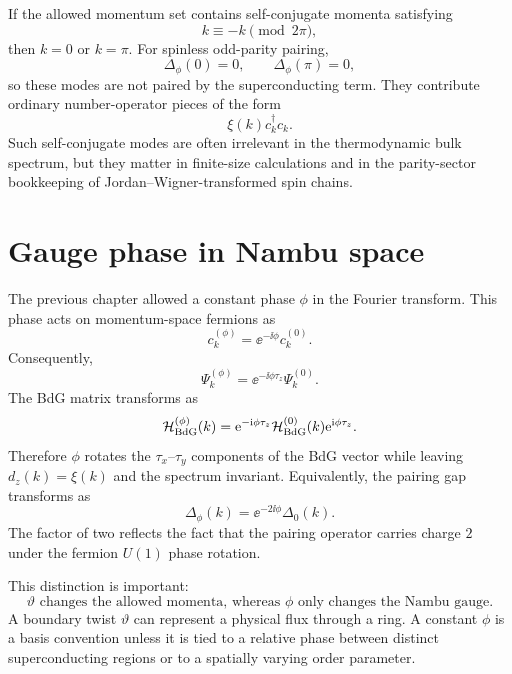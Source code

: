 If the allowed momentum set contains self-conjugate momenta satisfying
\begin{equation}
    k\equiv -k \pmod{2\pi},
\end{equation}
then $k=0$ or $k=\pi$.  For spinless odd-parity pairing,
\begin{equation}
    \Delta_\phi(0)=0,
    \qquad
    \Delta_\phi(\pi)=0,
\end{equation}
so these modes are not paired by the superconducting term.  They contribute
ordinary number-operator pieces of the form
\begin{equation}
    \xi(k)c_k^\dagger c_k.
\end{equation}
Such self-conjugate modes are often irrelevant in the thermodynamic bulk
spectrum, but they matter in finite-size calculations and in the parity-sector
bookkeeping of Jordan--Wigner-transformed spin chains.

\section{Gauge phase in Nambu space}

The previous chapter allowed a constant phase $\phi$ in the Fourier transform.
This phase acts on momentum-space fermions as
\begin{equation}
    c_k^{(\phi)}=\ee^{-\ii\phi}c_k^{(0)}.
\end{equation}
Consequently,
\begin{equation}
\label{eq:bdg-chapter-nambu-gauge-transformation}
    \Psi_k^{(\phi)}
    =
    \ee^{-\ii\phi\tau_z}\Psi_k^{(0)}.
\end{equation}
The BdG matrix transforms as
\begin{equation}
\label{eq:bdg-chapter-bdg-gauge-transformation}
    \mathcal{H}_{\rm BdG}^{(\phi)}(k)
    =
    \mathrm{e}^{-\mathrm{i}\phi\tau_z}
    \mathcal{H}_{\rm BdG}^{(0)}(k)
    \mathrm{e}^{\mathrm{i}\phi\tau_z}.
\end{equation}
Therefore $\phi$ rotates the $\tau_x$--$\tau_y$ components of the BdG vector while
leaving $d_z(k)=\xi(k)$ and the spectrum invariant.  Equivalently, the pairing
gap transforms as
\begin{equation}
\label{eq:bdg-chapter-gap-gauge-phase}
    \Delta_\phi(k)=\ee^{-2\ii\phi}\Delta_0(k).
\end{equation}
The factor of two reflects the fact that the pairing operator carries charge
$2$ under the fermion $U(1)$ phase rotation.

This distinction is important:
\begin{equation}
    \vartheta \text{ changes the allowed momenta, whereas } \phi
    \text{ only changes the Nambu gauge.}
\end{equation}
A boundary twist $\vartheta$ can represent a physical flux through a ring.  A
constant $\phi$ is a basis convention unless it is tied to a relative phase
between distinct superconducting regions or to a spatially varying order
parameter.

